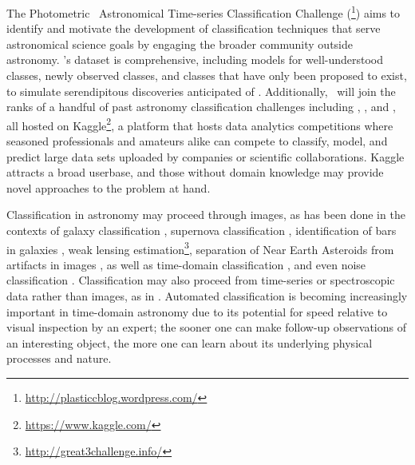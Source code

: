 The Photometric \lsst\ Astronomical Time-series Classification Challenge (\plasticc\footnote{\url{http://plasticcblog.wordpress.com/}}) aims to identify and motivate the development of classification techniques that serve astronomical science goals by engaging the broader community outside astronomy.
\plasticc's dataset is comprehensive, including models for well-understood classes, newly observed classes, and classes that have only been proposed to exist, to simulate serendipitous discoveries anticipated of \lsst.
Additionally, \plasticc\ will join the ranks of a handful of past astronomy classification challenges including \citep[Mapping Dark Matter\footnote{\url{https://www.kaggle.com/c/mdm}}]{kitching_gravitational_2011}, \citep[Observing Dark Worlds\footnote{\url{https://www.kaggle.com/c/DarkWorlds}}]{harvey_observing_2013}, and  \citep[the Galaxy Challenge\footnote{\url{https://www.kaggle.com/c/galaxy-zoo-the-galaxy-challenge}}]{dieleman_rotation-invariant_2015}, all hosted on Kaggle\footnote{\url{https://www.kaggle.com/}}, a platform that hosts data analytics competitions where seasoned professionals and amateurs alike can compete to classify, model, and predict large data sets uploaded by companies or scientific collaborations.
Kaggle attracts a broad userbase, and those without domain knowledge may provide novel approaches to the problem at hand.

Classification in astronomy may proceed through images, as has been done in the contexts of galaxy classification \citep{hoyle_measuring_2016}, supernova classification \citep{cabrera-vives_deep-hits:_2017}, identification of bars in galaxies \citep{abraham_detection_2018}, weak lensing estimation\footnote{\url{http://great3challenge.info/}}\citep{mandelbaum_third_2014}, separation of Near Earth Asteroids from artifacts in images \citep{morii_machine-learning_2016}, as well as  time-domain classification \citep{morii_machine-learning_2016, mahabal_deep-learnt_2017, zevin_gravity_2017}, and even noise classification \citep{zevin_gravity_2017, george_classification_2018}.
Classification may also proceed from time-series or spectroscopic data rather than images, as in \citet{newling_statistical_2011, richards_construction_2012, 2013MNRAS.430..509I, 2015ApJS..219...39R, armstrong_k2_2016, lochner_photometric_2016, moller_photometric_2016}.
Automated classification \citep{2008AN....329..288M, djorgovski_towards_2011, bloom_automating_2012, djorgovski_flashes_2012, narayan_machine_2018} is becoming increasingly important in time-domain astronomy due to its potential for speed relative to visual inspection by an expert; the sooner one can make follow-up observations of an interesting object, the more one can learn about its underlying physical processes and nature.

